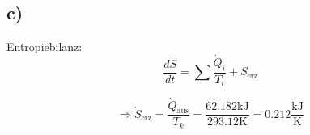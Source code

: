 

\subsection*{c)}

Entropiebilanz:
\[
\frac{d\dot{S}}{dt} = \sum \frac{\dot{Q}_i}{T_i} + \dot{S}_{\text{erz}}
\]

\[
\Rightarrow \dot{S}_{\text{erz}} = \frac{\dot{Q}_{\text{aus}}}{T_k} = \frac{62.182 \text{kJ}}{293.12 \text{K}} = 0.212 \frac{\text{kJ}}{\text{K}}
\]